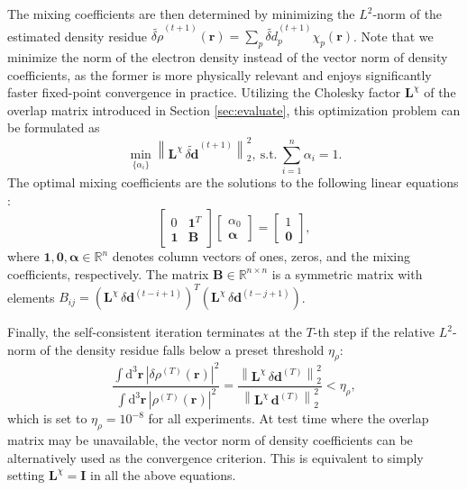 \documentclass[%
reprint,
superscriptaddress,
bibnotes,
amsmath,amssymb,
aps,
floatfix, %
]{revtex4-2}
\begin{document}
The mixing coefficients are then determined by minimizing the $L^2$-norm of the estimated density residue $\widetilde{\delta \rho}^{(t+1)} (\bm{r}) = \sum_{p}\widetilde{\delta d}^{(t+1)}_{p} \chi_p(\bm{r})$. Note that we minimize the norm of the electron density instead of the vector norm of density coefficients, as the former is more physically relevant and enjoys significantly faster fixed-point convergence in practice. Utilizing the Cholesky factor ${\mathbf{L}^\chi}$ of the overlap matrix introduced in Section \ref{sec:evaluate}, this optimization problem can be formulated as
\begin{equation}
  \min_{\{\alpha_i\}} \left\|{\mathbf{L}^\chi} \, \widetilde{\delta \mathbf{d}}^{(t+1)} \right\|^2_2, ~ \text{s.t.} ~ \sum_{i=1}^n \alpha_i = 1.
\end{equation}
The optimal mixing coefficients are the solutions to the following linear equations \cite{pulay1980convergence}:
\begin{equation}
  \begin{bmatrix}
    0 & \mathbf{1}^T \\
    \mathbf{1} & \mathbf{B}
  \end{bmatrix}
  \begin{bmatrix}
    \alpha_0 \\
    \bm{\alpha}
  \end{bmatrix} =
  \begin{bmatrix}
    1 \\
    \mathbf{0}
  \end{bmatrix},
\end{equation}
where $\mathbf{1}, \mathbf{0}, \bm{\alpha} \in \mathbb{R}^{n}$ denotes column vectors of ones, zeros, and the mixing coefficients, respectively. The matrix $\mathbf{B} \in \mathbb{R}^{n \times n}$ is a symmetric matrix with elements $B_{ij} = ({\mathbf{L}^\chi} \,\delta \mathbf{d}^{(t-i+1)})^T ({\mathbf{L}^\chi}\, \delta \mathbf{d}^{(t-j+1)})$. 

Finally, the self-consistent iteration terminates at the $T$-th step if the relative $L^2$-norm of the density residue falls below a preset threshold $\eta_\rho$:
\begin{equation}
  \frac{\int \mathrm{d}^3 \bm{r} \, |\delta \rho^{(T)}(\bm{r})|^2}{\int \mathrm{d}^3 \bm{r} \, |\rho^{(T)}(\bm{r})|^2} = \frac{\left\| {\mathbf{L}^\chi} \, \delta \mathbf{d}^{(T)} \right\|^2_2}{\left\| {\mathbf{L}^\chi} \, \mathbf{d}^{(T)} \right\|^2_2} < \eta_\rho,
\end{equation}
which is set to $\eta_\rho = 10^{-8}$ for all experiments. At test time where the overlap matrix may be unavailable, the vector norm of density coefficients can be alternatively used as the convergence criterion. This is equivalent to simply setting $\mathbf{L}^\chi = \mathbf{I}$ in all the above equations.
\end{document}
